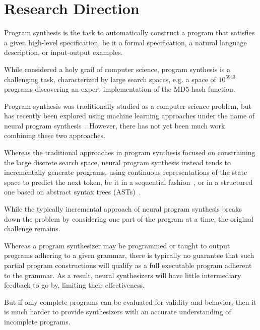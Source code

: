 \documentclass{article}
\begin{document}


\section{Research Direction}

Program synthesis is the task to automatically construct a program that satisfies a given high-level specification,
be it a formal specification, a natural language description, or input-output examples.

While considered a holy grail of computer science, program synthesis is a challenging task, characterized by large search spaces, e.g. a space of $10^{5943}$ programs discovering an expert implementation of the MD5 hash function.~\cite{gulwani2017program}

Program synthesis was traditionally studied as a computer science problem, but has recently been explored using machine learning approaches under the name of neural program synthesis~\citep{nps}.
However, there has not yet been much work combining these two approaches.

Whereas the traditional approaches in program synthesis focused on constraining the large discrete search space, neural program synthesis instead tends to incrementally generate programs, using continuous representations of the state space to predict the next token, be it in a sequential fashion~\citep{alphanpi}, or in a structured one based on abstract syntax trees (ASTs)~\citep{nsps}.

While the typically incremental approach of neural program synthesis breaks down the problem by considering one part of the program at a time, the original challenge remains.

Whereas a program synthesizer may be programmed or taught to output programs adhering to a given grammar, there is typically no guarantee that such partial program constructions will qualify as a full executable program adherent to the grammar.
As a result, neural synthesizers will have little intermediary feedback to go by, limiting their effectiveness.

But if only complete programs can be evaluated for validity and behavior, then 
it is much harder to provide synthesizers with an accurate understanding of incomplete programs.
\end{document}

